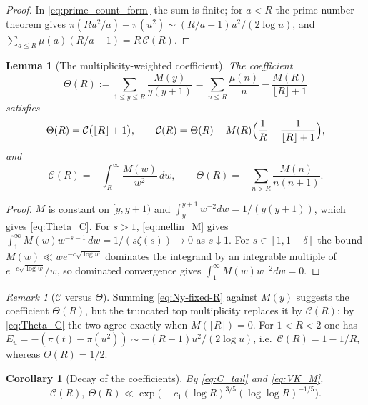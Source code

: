 \documentclass[11pt]{amsart}
\numberwithin{equation}{section}
\theoremstyle{plain}
\newtheorem{lemma}[theorem]{Lemma}
\newtheorem{corollary}[theorem]{Corollary}
\theoremstyle{definition}
\theoremstyle{remark}
\newtheorem{remark}[theorem]{Remark}
\newcommand{\Cc}{\mathcal{C}}
\begin{document}
\begin{proof}
In \eqref{eq:prime_count_form} the sum is finite; for $a<R$ the prime number
theorem gives $\pi(Ru^2/a)-\pi(u^2)\sim(R/a-1)u^2/(2\log u)$, and
$\sum_{a\le R}\mu(a)(R/a-1)=R\,\Cc(R)$.
\end{proof}

\begin{lemma}[The multiplicity-weighted coefficient]
\label{lem:copy-weight-coefficient}
The coefficient
\begin{equation}
\label{eq:Theta_def}
  \Theta(R):=\sum_{1\le y\le R}\frac{M(y)}{y(y+1)}
  =\sum_{n\le R}\frac{\mu(n)}n-\frac{M(R)}{\lfloor R\rfloor+1}
\end{equation}
satisfies
\begin{equation}
\label{eq:Theta_C}
  \Theta(R)=\Cc\bigl(\lfloor R\rfloor+1\bigr),\qquad
  \Cc(R)=\Theta(R)-M(R)\Bigl(\frac1R-\frac1{\lfloor R\rfloor+1}\Bigr),
\end{equation}
and
\begin{equation}
\label{eq:C_tail}
  \Cc(R)=-\int_R^\infty\frac{M(w)}{w^2}\,dw,\qquad
  \Theta(R)=-\sum_{n>R}\frac{M(n)}{n(n+1)}.
\end{equation}
\end{lemma}

\begin{proof}
$M$ is constant on $[y,y+1)$ and $\int_y^{y+1}w^{-2}dw=1/(y(y+1))$, which
gives \eqref{eq:Theta_C}. For $s>1$, \eqref{eq:mellin_M} gives
$\int_1^\infty M(w)w^{-s-1}\,dw=1/(s\zeta(s))\to0$ as $s\downarrow1$. For
$s\in[1,1+\delta]$ the bound $M(w)\ll we^{-c\sqrt{\log w}}$ dominates the
integrand by an integrable multiple of $e^{-c\sqrt{\log w}}/w$, so dominated
convergence gives $\int_1^\infty M(w)w^{-2}dw=0$.
\end{proof}

\begin{remark}[$\Cc$ versus $\Theta$]
\label{rem:C-vs-Theta}
Summing \eqref{eq:Ny-fixed-R} against $M(y)$ suggests the coefficient
$\Theta(R)$, but the truncated top multiplicity replaces it by $\Cc(R)$; by
\eqref{eq:Theta_C} the two agree exactly when $M(\lfloor R\rfloor)=0$. For
$1<R<2$ one has $E_u=-(\pi(t)-\pi(u^2))\sim-(R-1)u^2/(2\log u)$, i.e.\
$\Cc(R)=1-1/R$, whereas $\Theta(R)=1/2$.
\end{remark}

\begin{corollary}[Decay of the coefficients]
\label{cor:AR-VK}
By \eqref{eq:C_tail} and \eqref{eq:VK_M},
\begin{equation}
\label{eq:AR-VK}
  \Cc(R),\ \Theta(R)\ll\exp\bigl(-c_1(\log R)^{3/5}(\log\log R)^{-1/5}\bigr).
\end{equation}
\end{corollary}
\end{document}
